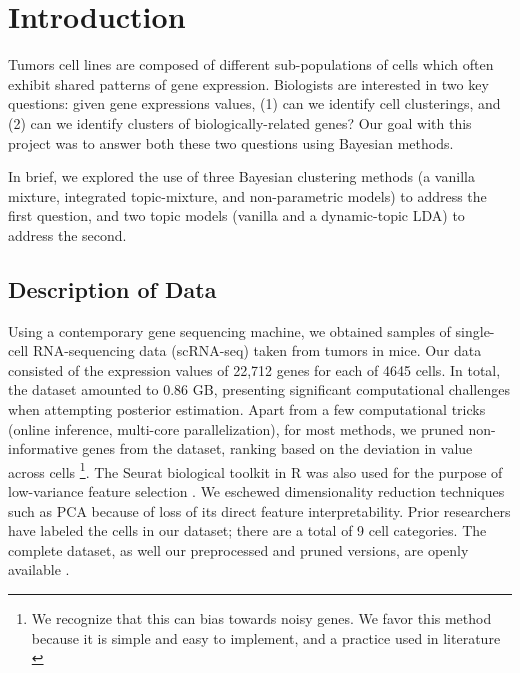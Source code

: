 \documentclass{article}
\begin{document}
 


\section{Introduction}
\label{intro}
Tumors cell lines are composed of different sub-populations of cells which often exhibit shared patterns of gene expression. Biologists are interested in two key questions: given gene expressions values, (1) can we identify cell clusterings, and (2) can we identify clusters of biologically-related genes? Our goal with this project was to answer both these two questions using Bayesian methods.

In brief, we explored the use of three Bayesian clustering methods (a vanilla mixture, integrated topic-mixture, and non-parametric models) to address the first question, and two topic models (vanilla and a dynamic-topic LDA) to address the second. 

\subsection{Description of Data}
Using a contemporary gene sequencing machine, we obtained samples of single-cell RNA-sequencing data (scRNA-seq) taken from tumors in mice. Our data consisted of the expression values of 22,712 genes for each of 4645 cells. In total, the dataset amounted to 0.86 GB, presenting significant computational challenges when attempting posterior estimation. Apart from a few computational tricks (online inference, multi-core parallelization), for most methods, we pruned non-informative genes from the dataset, ranking based on the deviation in value across cells \footnote{We recognize that this can bias towards noisy genes. We favor this method because it is simple and easy to implement, and a practice used in literature \cite{pruning}}. The Seurat biological toolkit in R was also used for the purpose of low-variance feature selection \cite{seurat}. We eschewed dimensionality reduction techniques such as PCA because of loss of its direct feature interpretability. Prior researchers have labeled the cells in our dataset; there are a total of 9 cell categories. The complete dataset, as well our preprocessed and pruned versions, are openly available \cite{dataset}.
\end{document}

